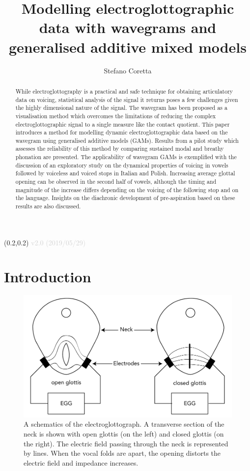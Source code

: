 \documentclass[
  11pt,
  a4paper,
]{article}
\title{Modelling electroglottographic data with wavegrams and generalised
additive mixed models}
\author{Stefano Coretta}
\date{}
\begin{document}
\begin{textblock}{3}(0.2,0.2)
  \textcolor{lightgray}{v2.0 (2019/05/29)}
\end{textblock}
\maketitle

\begin{abstract}
While electroglottography is a practical and safe technique for obtaining articulatory data on voicing, statistical analysis of the signal it returns poses a few challenges given the highly dimensional nature of the signal.
The wavegram has been proposed as a visualisation method which overcomes the limitations of reducing the complex electroglottographic signal to a single measure like the contact quotient.
This paper introduces a method for modelling dynamic electroglottographic data based on the wavegram using generalised additive models (GAMs).
Results from a pilot study which assesses the reliability of this method by comparing sustained modal and breathy phonation are presented.
The applicability of wavegram GAMs is exemplified with the discussion of an exploratory study on the dynamical properties of voicing in vowels followed by voiceless and voiced stops in Italian and Polish.
Increasing average glottal opening can be observed in the second half of vowels, although the timing and magnitude of the increase differs depending on the voicing of the following stop and on the language.
Insights on the diachronic development of pre-aspiration based on these results are also discussed.
\end{abstract}

\hypertarget{introduction}{%
\section{Introduction}\label{introduction}}

\begin{figure}
  \centering
  \includegraphics{./img/egg-setup.pdf}
  \caption{A schematics of the electroglottograph. A transverse section of the neck is shown with open glottis (on the left) and closed glottis (on the right). The electric field passing through the neck is represented by lines. When the vocal folds are apart, the opening distorts the electric field and impedance increases.}
  \label{f:egg-setup}
\end{figure}
\end{document}
